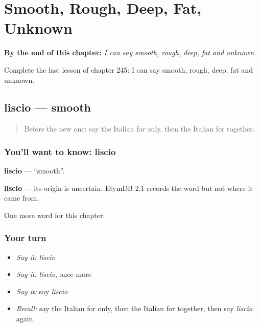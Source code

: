 
\chapter{Smooth, Rough, Deep, Fat, Unknown}
\label{ch:it-smooth-rough-deep-fat-unknown}

\begin{chapteropening}
\textbf{By the end of this chapter:} \emph{I can say smooth, rough, deep, fat and unknown.}

Complete the last lesson of chapter 245: I can say smooth, rough, deep, fat and unknown.
\end{chapteropening}

\section[liscio]{liscio — smooth}

\label{lesson:IT-C245-liscio}



\begin{quote}
Before the new one: say the Italian for only, then the Italian for together.
\end{quote}

\subsection*{You'll want to know: liscio}
\textbf{liscio} — \textquotedblleft{}smooth\textquotedblright{}.

\begin{cousinweb}
\textbf{liscio} — its origin is uncertain. EtymDB 2.1 records the word but not where it came from.
\end{cousinweb}

\begin{grammarlens}[title={What you've built}]
One more word for this chapter.
\end{grammarlens}

\subsection*{Your turn}
\begin{itemize}
\raggedright
  \item \emph{Say it:} \emph{liscio}
  \item \emph{Say it:} \emph{liscio}, once more
  \item \emph{Say it:} say \emph{liscio}
  \item \emph{Recall:} say the Italian for only, then the Italian for together, then say \emph{liscio} again
\end{itemize}

